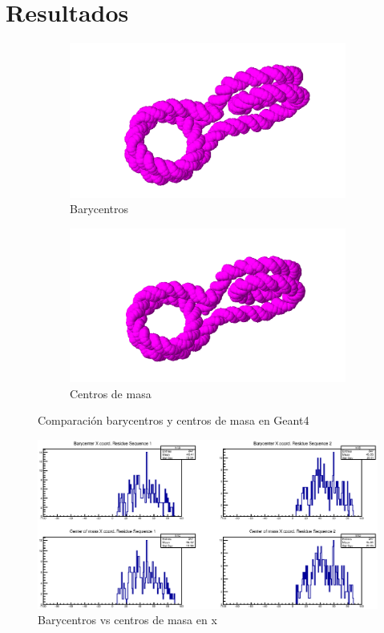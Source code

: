 \clearpage
\section{Resultados}
\label{sec:res}

\begin{figure}
\centering
\begin{subfigure}{.6\textwidth}
  \centering
  \includegraphics[width=.7\linewidth]{./Figures/a.png}
  \caption{Barycentros}
  \label{fig:sub1}
\end{subfigure}%
\begin{subfigure}{.5\textwidth}
  \centering
  \includegraphics[width=.7\linewidth]{./Figures/b.png}
  \caption{Centros de masa}
  \label{fig:sub2}
\end{subfigure}
\caption{Comparación barycentros y centros de masa en Geant4}
\label{fig:test}
\end{figure}


\begin{figure}[htbp]
    \centering
    \includegraphics[width=1\linewidth]{./Figures/can1.eps}
    \caption[Barycentros vs centros de masa en x]{Barycentros vs centros de masa en x} %
    \label{fig:canx}
\end{figure}

